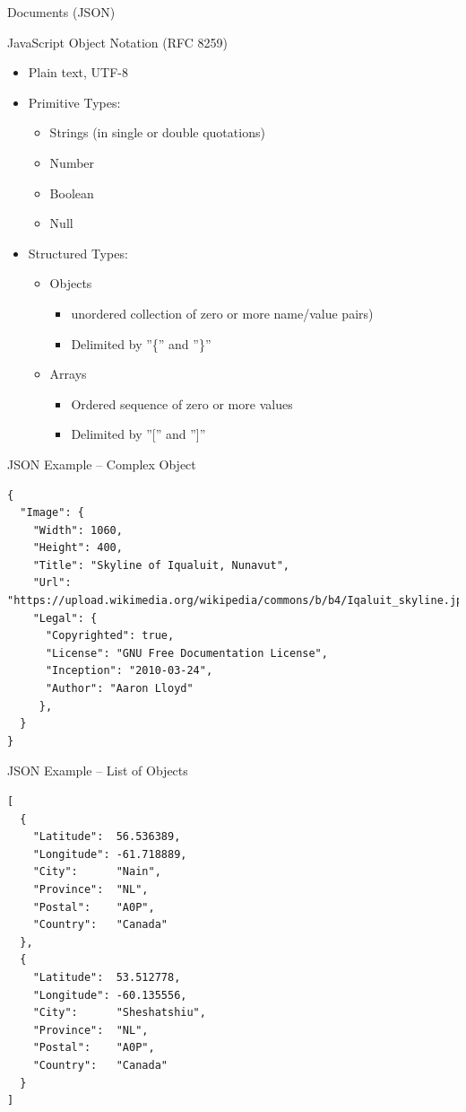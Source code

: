 \documentclass[ignorenonframetext,xcolor=x11names]{beamer}
\begin{document}
\begin{frame}{Documents (JSON)}
\begin{block}{JavaScript Object Notation (RFC 8259)}
\begin{itemize}
	\item Plain text, UTF-8 
	\item Primitive Types:
	\begin{itemize}
		\item Strings (in single or double quotations)
		\item Number
		\item Boolean
		\item Null
	\end{itemize}
	\item Structured Types:
	\begin{itemize}
		\item Objects
		\begin{itemize}
			\item unordered collection of zero or more name/value pairs)
			\item Delimited by ''\{'' and ''\}''
		\end{itemize}
		\item Arrays
		\begin{itemize}
			\item Ordered sequence of zero or more values
			\item Delimited by ''['' and '']''
		\end{itemize}
	\end{itemize}
\end{itemize}
\end{block}
\end{frame}

\begin{frame}[fragile]{JSON Example -- Complex Object}
\footnotesize
\begin{verbatim}
{
  "Image": {
    "Width": 1060,
    "Height": 400,
    "Title": "Skyline of Iqualuit, Nunavut",
    "Url": 
"https://upload.wikimedia.org/wikipedia/commons/b/b4/Iqaluit_skyline.jpg",
    "Legal": {
      "Copyrighted": true,
      "License": "GNU Free Documentation License",
      "Inception": "2010-03-24",
      "Author": "Aaron Lloyd"
     },
  }
}
\end{verbatim}
\end{frame}

\begin{frame}[fragile]{JSON Example -- List of Objects}
\footnotesize
\begin{verbatim}
[
  {
    "Latitude":  56.536389,
    "Longitude": -61.718889,
    "City":      "Nain",
    "Province":  "NL",
    "Postal":    "A0P",
    "Country":   "Canada"
  },
  {
    "Latitude":  53.512778,
    "Longitude": -60.135556,
    "City":      "Sheshatshiu",
    "Province":  "NL",
    "Postal":    "A0P",
    "Country":   "Canada"
  }
]
\end{verbatim}
\end{frame}
\end{document}
